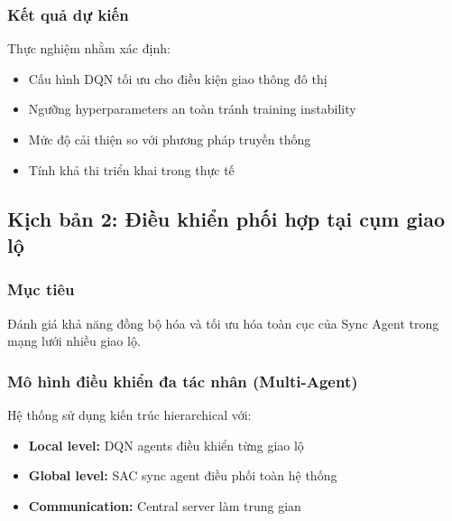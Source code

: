 \subsubsection{Kết quả dự kiến}
Thực nghiệm nhằm xác định:
\begin{itemize}
    \item Cấu hình DQN tối ưu cho điều kiện giao thông đô thị
    \item Ngưỡng hyperparameters an toàn tránh training instability
    \item Mức độ cải thiện so với phương pháp truyền thống
    \item Tính khả thi triển khai trong thực tế
\end{itemize}

\subsection{Kịch bản 2: Điều khiển phối hợp tại cụm giao lộ}
\subsubsection{Mục tiêu}
Đánh giá khả năng đồng bộ hóa và tối ưu hóa toàn cục của Sync Agent trong mạng lưới
nhiều giao lộ.

\subsubsection{Mô hình điều khiển đa tác nhân (Multi-Agent)}
Hệ thống sử dụng kiến trúc hierarchical với:
\begin{itemize}
    \item \textbf{Local level:} DQN agents điều khiển từng giao lộ

    \item \textbf{Global level:} SAC sync agent điều phối toàn hệ thống

    \item \textbf{Communication:} Central server làm trung gian
\end{itemize}
\newpage
